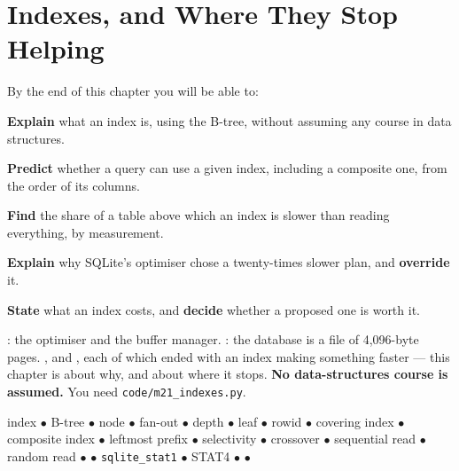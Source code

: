 \chapter{Indexes, and Where They Stop Helping}\label{ch:indexes}

\begin{outcomes}
By the end of this chapter you will be able to:
\begin{tight}
  \item \textbf{Explain} what an index is, using the B-tree, without
        assuming any course in data structures.
  \item \textbf{Predict} whether a query can use a given index, including a
        composite one, from the order of its columns.
  \item \textbf{Find} the share of a table above which an index is slower than
        reading everything, by measurement.
  \item \textbf{Explain} why SQLite's optimiser chose a twenty-times slower
        plan, and \textbf{override} it.
  \item \textbf{State} what an index costs, and \textbf{decide} whether a
        proposed one is worth it.
\end{tight}
\end{outcomes}

\begin{prereq}
: the optimiser and the buffer manager. :
the database is a file of 4{,}096-byte pages. ,
 and , each of which ended with an index
making something faster --- this chapter is about why, and about where it
stops. \textbf{No data-structures course is assumed.} You need
\texttt{code/m21\_indexes.py}.
\end{prereq}

\begin{keyterms}
index $\bullet$ B-tree $\bullet$ node $\bullet$ fan-out $\bullet$ depth
$\bullet$ leaf $\bullet$ rowid $\bullet$ covering index $\bullet$ composite
index $\bullet$ leftmost prefix $\bullet$ selectivity $\bullet$ crossover
$\bullet$ sequential read $\bullet$ random read $\bullet$ 
$\bullet$ \texttt{sqlite\_stat1} $\bullet$ STAT4 $\bullet$ 
$\bullet$ 
\end{keyterms}

